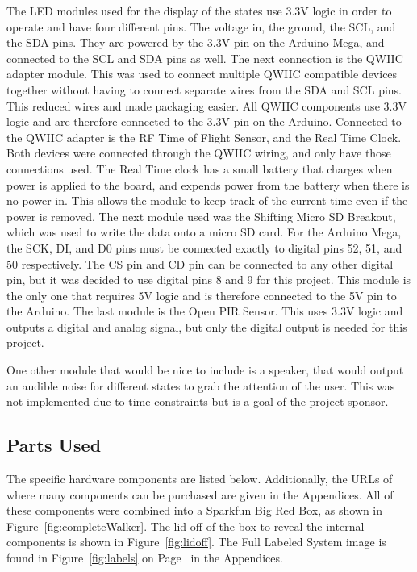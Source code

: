 \documentclass{article}
\begin{document}
The LED modules used for the display of the states use 3.3V logic in order to operate and have four different pins. The voltage in, the ground, the SCL, and the SDA pins. They are powered by the 3.3V pin on the Arduino Mega, and connected to the SCL and SDA pins as well. The next connection is the QWIIC adapter module. This was used to connect multiple QWIIC compatible devices together without having to connect separate wires from the SDA and SCL pins. This reduced wires and made packaging easier. All QWIIC components use 3.3V logic and are therefore connected to the 3.3V pin on the Arduino. Connected to the QWIIC adapter is the RF Time of Flight Sensor, and the Real Time Clock. Both devices were connected through the QWIIC wiring, and only have those connections used. The Real Time clock has a small battery that charges when power is applied to the board, and expends power from the battery when there is no power in. This allows the module to keep track of the current time even if the power is removed. The next module used was the Shifting Micro SD Breakout, which was used to write the data onto a micro SD card. For the Arduino Mega, the SCK, DI, and D0 pins must be connected exactly to digital pins 52, 51, and 50 respectively. The CS pin and CD pin can be connected to any other digital pin, but it was decided to use digital pins 8 and 9 for this project. This module is the only one that requires 5V logic and is therefore connected to the 5V pin to the Arduino. The last module is the Open PIR Sensor. This uses 3.3V logic and outputs a digital and analog signal, but only the digital output is needed for this project. 

One other module that would be nice to include is a speaker, that would output an audible noise for different states to grab the attention of the user. This was not implemented due to time constraints but is a goal of the project sponsor.

\subsection{Parts Used}
The specific hardware components are listed below. Additionally, the URLs of where many components can be purchased are given in the Appendices. All of these components were combined into a Sparkfun Big Red Box, as shown in Figure~\ref{fig:completeWalker}. The lid off of the box to reveal the internal components is shown in Figure~\ref{fig:lidoff}. The Full Labeled System image is found in Figure~\ref{fig:labels} on Page~\pageref{fig:labels} in the Appendices.  
\end{document}
